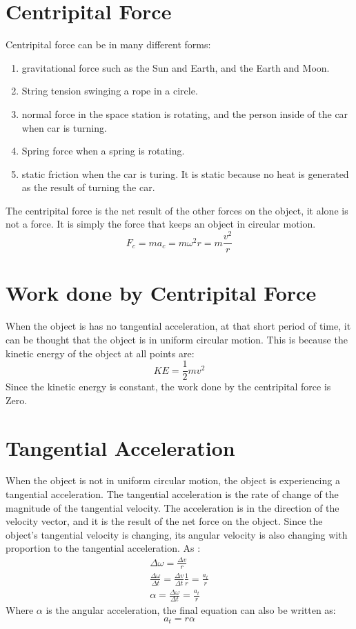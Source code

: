 \documentclass[]{article}
\begin{document}
    \section{Centripital Force}\label{sec:centripital-force}
    Centripital force can be in many different forms:
    \begin {enumerate}
        \item gravitational force such as the Sun and Earth, and the Earth
        and Moon.
        \item String tension swinging a rope in a circle.
        \item normal force in the space station is rotating, and the person
        inside of the car when car is turning.
        \item Spring force when a spring is rotating.
        \item static friction when the car is turing. It is static because no
        heat is generated as the result of turning the car.
    \end{enumerate}
    The centripital force is the net result of the other forces on the object,
    it alone is not a force. It is simply the force that keeps an
    object in circular motion.
    \[F_c = m a_c = m \omega ^2 r = m\frac{v^2}{r}\]

    \section{Work done by Centripital Force}
        When the object is has no tangential acceleration, at that short
        period of time, it can be thought that the object is in uniform
        circular motion.
        This is because the kinetic energy of the object at all points are:
            \[KE = \frac{1}{2} m v^2\]
        Since the kinetic energy is constant, the work done by the
        centripital force is Zero.
    \section{Tangential Acceleration}
        When the object is not in uniform circular motion, the object is
        experiencing a tangential acceleration. The tangential acceleration
        is the rate of change of the magnitude of the tangential velocity. The
        acceleration is in the direction of the velocity vector, and it is
        the result of the net force on the object. Since the object's
        tangential velocity is changing, its angular velocity is also
        changing with proportion to the tangential acceleration. As :
        \begin{gather*}
            \Delta \omega = \frac{\Delta v}{r}\\
            \frac{\Delta\omega}{\Delta t} = \frac{\Delta v}{\Delta t}
            \frac{1}{r} = \frac{a_t}{r}\\
            \alpha = \frac{\Delta \omega}{\Delta t} = \frac{a_t}{r}
        \end{gather*}
        Where $\alpha$ is the angular acceleration, the final equation can
    also be written as:
        \[a_t = r \alpha\]
\end{document}
